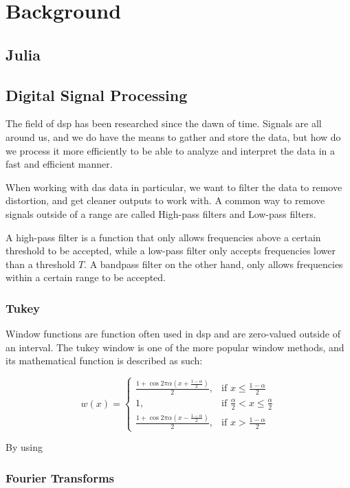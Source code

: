 \chapter{Background}
\label{chap:back}

\section{Julia}



\section{Digital Signal Processing}

The field of \acrfull{dsp} has been researched since the dawn of time. Signals are all around us, and we do have the means to gather and store the data, but how do we process it more efficiently to be able to analyze and interpret the data in a fast and efficient manner.

When working with \acrshort{das} data in particular, we want to filter the data to remove distortion, and get cleaner outputs to work with. A common way to remove signals outside of a range are called High-pass filters and Low-pass filters. 

A high-pass filter is a function that only allows frequencies above a certain threshold to be accepted, while a low-pass filter only accepts frequencies lower than a threshold $T$. A bandpass filter on the other hand, only allows frequencies within a certain range to be accepted. 

\subsection{Tukey}

Window functions are function often used in \acrshort{dsp} and are zero-valued outside of an interval. The tukey window is one of the more popular window methods, and its mathematical function is described as such: 

\[
    w(x)= 
\begin{cases}
    \frac{1 + \cos{2 \pi \alpha (x + \frac{1-\alpha}{2})}}{2}, & \text{if } x \leq \frac{1-\alpha}{2}\\
    1,              & \text{if } \frac{\alpha}{2} < x \leq \frac{\alpha}{2}\\
    \frac{1 + \cos{2 \pi \alpha (x - \frac{1-\alpha}{2})}}{2}, & \text{if } x > \frac{1-\alpha}{2}
\end{cases}
\]

By using 
\subsection{Fourier Transforms}